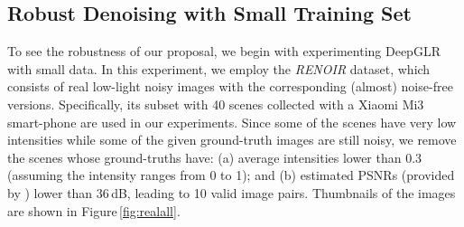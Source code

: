 \documentclass[10pt,twocolumn,letterpaper]{article}
\begin{document}
\subsection{Robust Denoising with Small Training Set}\label{ssec:samlldata}



To see the robustness of our proposal, we begin with experimenting DeepGLR with small data.
In this experiment, we employ the {\it RENOIR} \cite{anaya2018renoir} dataset, which consists of real low-light noisy images with the corresponding (almost) noise-free versions. 
Specifically, its subset with 40 scenes collected with a Xiaomi Mi3 smart-phone are used in our experiments.
Since some of the scenes have very low intensities while some of the given ground-truth images are still noisy, we remove the scenes whose ground-truths have: (a) average intensities lower than 0.3 (assuming the intensity ranges from 0 to 1); and (b) estimated PSNRs (provided by \cite{anaya2018renoir}) lower than 36\,dB, leading to 10 valid image pairs. 
Thumbnails of the images are shown in Figure\,\ref{fig:realall}. 
\end{document}
